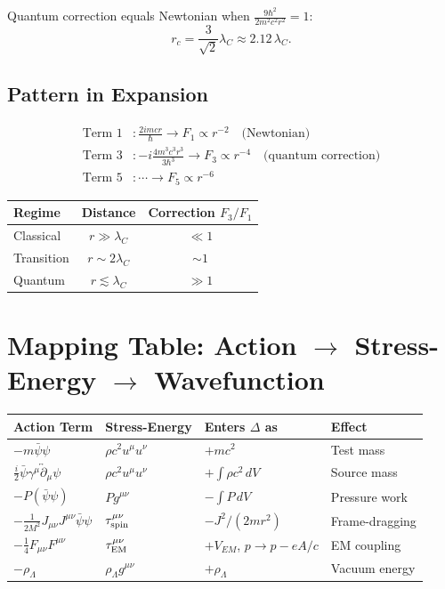 \documentclass[11pt,a4paper]{article}
\theoremstyle{definition}
\theoremstyle{remark}
\begin{document}
	Quantum correction equals Newtonian when $\frac{9\hbar^2}{2m^2c^2r^2}=1$:
	\begin{equation}
		r_c = \frac{3}{\sqrt{2}}\lambda_C \approx 2.12\,\lambda_C.
	\end{equation}
	
	\subsection{Pattern in Expansion}
	
	\begin{align}
		\text{Term 1} &: \frac{2imcr}{\hbar} \to F_1 \propto r^{-2} \quad\text{(Newtonian)} \\
		\text{Term 3} &: -i\frac{4m^3c^3r^3}{3\hbar^3} \to F_3 \propto r^{-4} \quad\text{(quantum correction)} \\
		\text{Term 5} &: \cdots \to F_5 \propto r^{-6}
	\end{align}
	
	\begin{table}[h]
		\centering
		\begin{tabular}{lcc}
			\toprule
			Regime & Distance & Correction $F_3/F_1$ \\
			\midrule
			Classical   & $r\gg\lambda_C$ & $\ll1$ \\
			Transition  & $r\sim2\lambda_C$ & $\sim1$ \\
			Quantum     & $r\lesssim\lambda_C$ & $\gg1$ \\
			\bottomrule
		\end{tabular}
	\end{table}
	
	\section{Mapping Table: Action $\to$ Stress-Energy $\to$ Wavefunction}
	
	\begin{center}
		\begin{tabular}{|l|l|l|l|}
			\hline
			\textbf{Action Term} & \textbf{Stress-Energy} & \textbf{Enters $\Delta$ as} & \textbf{Effect} \\
			\hline
			$-m\bar{\psi}\psi$ & $\rho c^2 u^\mu u^\nu$ & $+mc^2$ & Test mass \\
			$\frac{i}{2}\bar{\psi}\gamma^\mu\overleftrightarrow{\partial}_\mu\psi$ & $\rho c^2 u^\mu u^\nu$ & $+\int\rho c^2\,dV$ & Source mass \\
			$-P(\bar{\psi}\psi)$ & $Pg^{\mu\nu}$ & $-\int P\,dV$ & Pressure work \\
			$-\frac{1}{2M^2}J_{\mu\nu}J^{\mu\nu}\bar{\psi}\psi$ & $\tau^{\mu\nu}_{\rm spin}$ & $-J^2/(2mr^2)$ & Frame-dragging \\
			$-\frac{1}{4}F_{\mu\nu}F^{\mu\nu}$ & $\tau^{\mu\nu}_{\rm EM}$ & $+V_{EM}$, $p\to p-eA/c$ & EM coupling \\
			$-\rho_\Lambda$ & $\rho_\Lambda g^{\mu\nu}$ & $+\rho_\Lambda$ & Vacuum energy \\
			\hline
		\end{tabular}
	\end{center}
	
\end{document}
